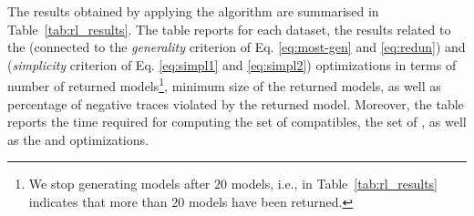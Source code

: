 The results obtained by applying the \nd algorithm are summarised in Table~\ref{tab:rl_results}. The table reports for each dataset, the results related to the \subsetclos (connected to the \emph{generality} criterion of Eq. \ref{eq:most-gen} and \ref{eq:redun}) and \minclos (\emph{simplicity} criterion of Eq. \ref{eq:simpl1} and \ref{eq:simpl2}) optimizations in terms of number of returned models\footnote{We stop generating models after $20$ models, i.e.,  in Table~\ref{tab:rl_results} indicates that more than $20$ models have been returned.}, minimum size of the returned models, as well as percentage of negative traces violated by the returned model. Moreover, the table reports the time required for computing the set of compatibles, the set of \sheriff, as well as the \subsetclos and \minclos optimizations.

